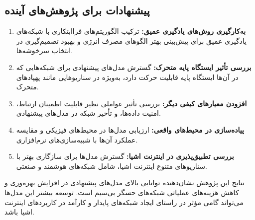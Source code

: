 \documentclass[12pt, onecolumn, a4paper]{article}
\begin{document}
\subsection*{پیشنهادات برای پژوهش‌های آینده}
\begin{enumerate}
	\item \textbf{به‌کارگیری روش‌های یادگیری عمیق:} ترکیب الگوریتم‌های فراابتکاری با شبکه‌های یادگیری عمیق برای پیش‌بینی بهتر الگوهای مصرف انرژی و بهبود تصمیم‌گیری در انتخاب سرخوشه‌ها.
	\item \textbf{بررسی تأثیر ایستگاه پایه متحرک:} گسترش مدل‌های پیشنهادی برای شبکه‌هایی که در آن‌ها ایستگاه پایه قابلیت حرکت دارد، به‌ویژه در سناریوهایی مانند پهپادهای متحرک.
	\item \textbf{افزودن معیارهای کیفی دیگر:} بررسی تأثیر عواملی نظیر قابلیت اطمینان ارتباط، امنیت داده‌ها، و تأخیر شبکه در مدل‌های پیشنهادی.
	\item \textbf{پیاده‌سازی در محیط‌های واقعی:} ارزیابی مدل‌ها در محیط‌های فیزیکی و مقایسه عملکرد آن‌ها با شبیه‌سازی‌های نرم‌افزاری.
	\item \textbf{بررسی تطبیق‌پذیری در اینترنت اشیا:} گسترش مدل‌ها برای سازگاری بهتر با سناریوهای متنوع اینترنت اشیا، شامل شبکه‌های هوشمند و صنعتی.
\end{enumerate}

نتایج این پژوهش نشان‌دهنده توانایی بالای مدل‌های پیشنهادی در افزایش بهره‌وری و کاهش هزینه‌های عملیاتی شبکه‌های حسگر بی‌سیم است. توسعه بیشتر این مدل‌ها می‌تواند گامی مؤثر در راستای ایجاد شبکه‌های پایدار و کارآمد در کاربردهای اینترنت اشیا باشد.
\end{document}
